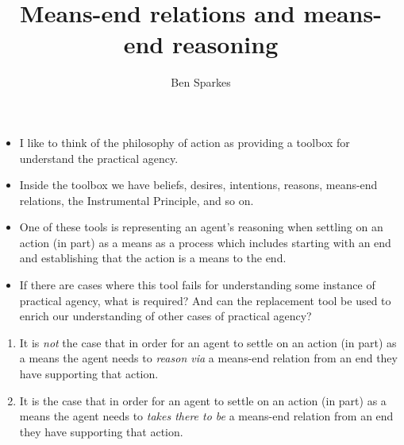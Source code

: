 \documentclass[10pt]{article}
\title{Means-end relations and means-end reasoning}
\author{Ben Sparkes}
\newcommand{\hozlinedash}[0]{%
  \noindent\hdashrule[0.5ex][c]{\textwidth}{.1pt}{2.5pt}
}
\begin{document}

\tableofcontents

\newpage

\maketitle



\hozlinedash



\begin{itemize}[noitemsep]
\item I like to think of the philosophy of action as providing a toolbox for understand the practical agency.
\item Inside the toolbox we have beliefs, desires, intentions, reasons, means-end relations, the Instrumental Principle, and so on.
\item One of these tools is representing an agent's reasoning when settling on an action (in part) as a means as a process which includes starting with an end and establishing that the action is a means to the end.
\item If there are cases where this tool fails for understanding some instance of practical agency, what is required?
  And can the replacement tool be used to enrich our understanding of other cases of practical agency?
\end{itemize}

\hozlinedash

\begin{enumerate}[label=\Alph*., ref=(\Alph*)]
\item It is \emph{not} the case that in order for an agent to settle on an action (in part) as a means the agent needs to \emph{reason via} a means-end relation from an end they have supporting that action.
\item It is the case that in order for an agent to settle on an action (in part) as a means the agent needs to \emph{takes there to be} a means-end relation from an end they have supporting that action.
\end{enumerate}
\end{document}
